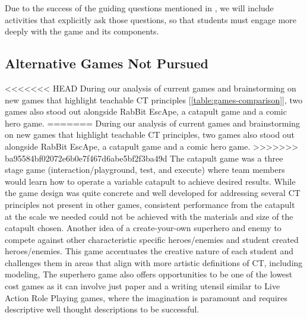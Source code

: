 \documentclass{acm_proc_article-sp}
\begin{document}
Due to the success of the guiding questions mentioned in {\em \hyperref[sec:observations]{}}, we will include activities that explicitly ask  those questions, so that students must engage more deeply with the game and its components.

\subsection{Alternative Games Not Pursued}
<<<<<<< HEAD
During our analysis of current games and brainstorming on new games that highlight teachable CT principles [\ref{table:games-comparison}], two games also stood out alongside RabBit EscApe, a catapult game and a comic hero game.
=======
\label{sec:terminated_games}
During our analysis of current games and brainstorming on new games that highlight teachable CT principles, two games also stood out alongside RabBit EscApe, a catapult game and a comic hero game.
>>>>>>> ba95584bf02072e6b0e7f467d6abe5bf2f3ba49d
The catapult game was a three stage game (interaction/playground, test, and execute) where team members would learn how to operate a variable catapult to achieve desired results.
While the game design was quite concrete and well developed for addressing several CT principles not present in other games, consistent performance from the catapult at the scale we needed could not be achieved with the materials and size of the catapult chosen.
Another idea of a create-your-own superhero and enemy to compete against other characteristic specific heroes/enemies and student created heroes/enemies.
This game accentuates the creative nature of each student and challenges them in areas that align with more artistic definitions of CT, including modeling, 
The superhero game also offers opportunities to be one of the lowest cost games as it can involve just paper and a writing utensil similar to Live Action Role Playing games, where the imagination is paramount and requires descriptive well thought descriptions to be successful.
\end{document}
